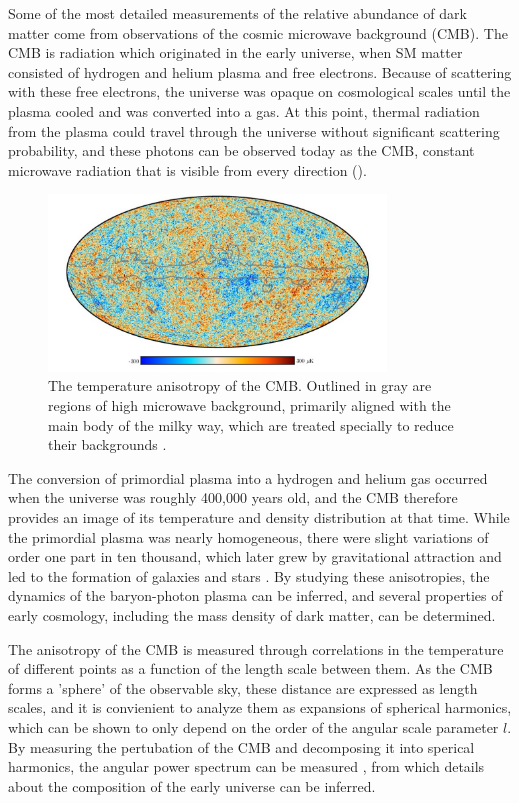 Some of the most detailed measurements of the relative abundance of dark matter come from observations of the cosmic microwave background (CMB).
The CMB is radiation which originated in the early universe, when SM matter consisted of hydrogen and helium plasma and free electrons.
Because of scattering with these free electrons, the universe was opaque on cosmological scales until the plasma cooled and was converted into a gas. 
At this point, thermal radiation from the plasma could travel through the universe without significant scattering probability, and these photons can be observed today as the CMB, constant microwave radiation that is visible from every direction ().

\begin{figure}[htpb]
	\label{fig:CMB}
	\centering
	\includegraphics[width=0.8\textwidth]{figures/cmb.png}
	\caption[The CMB temperature anisotropy]{The temperature anisotropy of the CMB. Outlined in gray are regions of high microwave background, primarily aligned with the main body of the milky way, which are treated specially to reduce their backgrounds \cite{PlanckCMB}.}
\end{figure}

The conversion of primordial plasma into a hydrogen and helium gas occurred when the universe was roughly 400,000 years old, and the CMB therefore provides an image of its temperature and density distribution at that time.
While the primordial plasma was nearly homogeneous, there were slight variations of order one part in ten thousand, which later grew by gravitational attraction and led to the formation of galaxies and stars \cite{kurkisuonio}.
By studying these anisotropies, the dynamics of the baryon-photon plasma can be inferred, and several properties of early cosmology, including the mass density of dark matter, can be determined.

The anisotropy of the CMB is measured through correlations in the temperature of different points as a function of the length scale between them. 
As the CMB forms a 'sphere' of the observable sky, these distance are expressed as length scales, and it is convienient to analyze them as expansions of spherical harmonics, which can be shown to only depend on the order of the angular scale parameter $l$. 
By measuring the pertubation of the CMB and decomposing it into sperical harmonics, the angular power spectrum can be measured , from which details about the composition of the early universe can be inferred.

